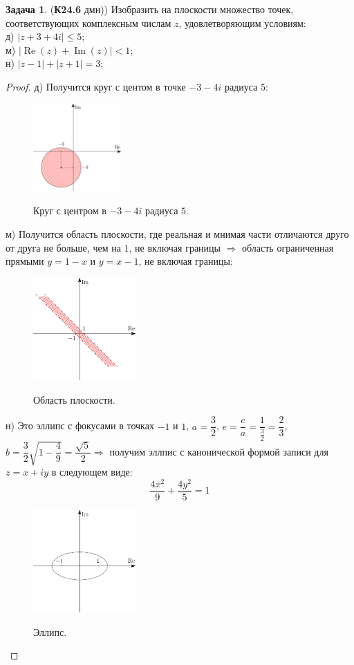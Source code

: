 \documentclass[12pt]{article}
\theoremstyle{definition}
\newtheorem{problem}{Задача}
\DeclareMathOperator{\IM}{\operatorname{Im}}
\DeclareMathOperator{\RE}{\operatorname{Re}}
\begin{document}
\begin{problem}(\textbf{К24.6} дмн))
	Изобразить на плоскости множество точек, соответствующих комплексным числам $z$, удовлетворяющим условиям:\\
	д) $|z + 3 + 4i| \leq 5$;\\
	м) $|\RE(z) + \IM(z)| < 1$;\\
	н) $|z-1| + |z +1| = 3$;
\end{problem}
\begin{proof}
	д) Получится круг с центом в точке $-3 - 4i$ радиуса $5$:
	\begin{figure}[H]
		\centering
		\includegraphics[width=0.3\textwidth]{AL1S1_HW_2.png}
		\label{1_2}
		\caption{Круг с центром в $-3-4i$ радиуса $5$.}
	\end{figure}
	м) Получится область плоскости, где реальная и мнимая части отличаются друго от друга не больше, чем на $1$, не включая границы $\Rightarrow$ область ограниченная прямыми $y = 1 - x$ и $y = x -1$, не включая границы:
	\begin{figure}[H]
		\centering
		\includegraphics[width=0.35\textwidth]{AL1S1_HW_3.png}
		\label{1_3}
		\caption{Область плоскости.}
	\end{figure}
	н) Это эллипс с фокусами в точках $-1$ и $1$, $a = \dfrac{3}{2}$, $e = \dfrac{c}{a} = \dfrac{1}{\tfrac{3}{2}} = \dfrac{2}{3}$, $b = \dfrac{3}{2}\sqrt{1- \dfrac{4}{9}} = \dfrac{\sqrt{5}}{2} \Rightarrow$ получим эллпис с канонической формой записи для $z = x + iy$ в следующем виде:
	$$
		\dfrac{4x^2}{9} + \dfrac{4y^2}{5} = 1
	$$
	\begin{figure}[H]
		\centering
		\includegraphics[width=0.35\textwidth]{AL1S1_HW_4.png}
		\label{1_4}
		\caption{Эллипс.}
	\end{figure}
\end{proof}
\end{document}
